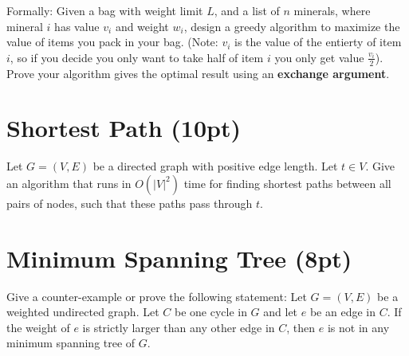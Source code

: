 \documentclass{article}
\begin{document}
Formally: Given a bag with weight limit $L$, and a list of $n$ minerals, where mineral $i$ has value $v_i$ and weight $w_i$, design a greedy algorithm to maximize the value of items you pack in your bag. (Note: $v_i$ is the value of the entierty of item $i$, so if you decide you only want to take half of item $i$ you only get value $\frac{v_i}{2}$). Prove your algorithm gives the optimal result using an \textbf{exchange argument}.


\section{Shortest Path (10pt)}
Let $G = (V, E)$ be a directed graph with positive edge length. Let $t ∈ V$. Give an algorithm that runs in $O(|V|^2)$ time for finding shortest paths between all pairs of nodes, such that these paths pass through $t$.


\section{Minimum Spanning Tree (8pt)}
Give a counter-example or prove the following statement: Let $G = (V, E)$ be a weighted undirected graph. Let $C$ be one cycle in $G$ and let $e$ be an edge in $C$. If the weight of $e$ is strictly larger than any other edge in $C$, then $e$ is not in any minimum spanning tree of $G$.
\end{document}
